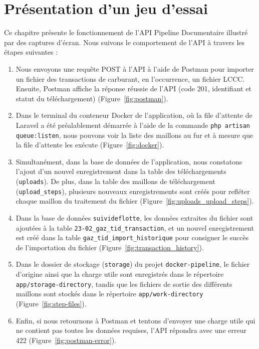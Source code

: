 \chapter{Présentation d'un jeu d'essai}\label{ch:jeu-essai}

Ce chapitre présente le fonctionnement de l'API Pipeline Documentaire illustré par des captures d'écran. Nous suivons le comportement de l'API à travers les étapes suivantes :

\begin{enumerate}
    \item Nous envoyons une requête POST à l'API à l'aide de Postman pour importer un fichier des transactions de carburant, en l'occurrence, un fichier LCCC. Ensuite, Postman affiche la réponse réussie de l'API (code 201, identifiant et statut du téléchargement) (Figure~\ref{fig:postman}).
    \item Dans le terminal du conteneur Docker de l'application, où la file d'attente de Laravel a été préalablement démarrée à l'aide de la commande \Verb|php artisan queue:listen|, nous pouvons voir la liste des maillons au fur et à mesure que la file d'attente les exécute (Figure~\ref{fig:docker}).
    \item Simultanément, dans la base de données de l'application, nous constatons l'ajout d'un nouvel enregistrement dans la table des téléchargements (\Verb|uploads|). De plus, dans la table des maillons de téléchargement (\Verb|upload_steps|), plusieurs nouveaux enregistrements sont créés pour refléter chaque maillon du traitement du fichier (Figure~\ref{fig:uploads_upload_steps}).
    \item Dans la base de données \Verb|suivideflotte|, les données extraites du fichier sont ajoutées à la table \Verb|23-02_gaz_tid_transaction|, et un nouvel enregistrement est créé dans la table \Verb|gaz_tid_import_historique| pour consigner le succès de l'importation du fichier (Figure~\ref{fig:transaction_history}).
    \item Dans le dossier de stockage (\Verb|storage|) du projet \Verb|docker-pipeline|, le fichier d'origine ainsi que la charge utile sont enregistrés dans le répertoire \Verb|app/storage-directory|, tandis que les fichiers de sortie des différents maillons sont stockés dans le répertoire \Verb|app/work-directory| (Figure~\ref{fig:step-files}).
    \item Enfin, si nous retournons à Postman et tentons d'envoyer une charge utile qui ne contient pas toutes les données requises, l'API répondra avec une erreur 422 (Figure~\ref{fig:postman-error}).
\end{enumerate}

